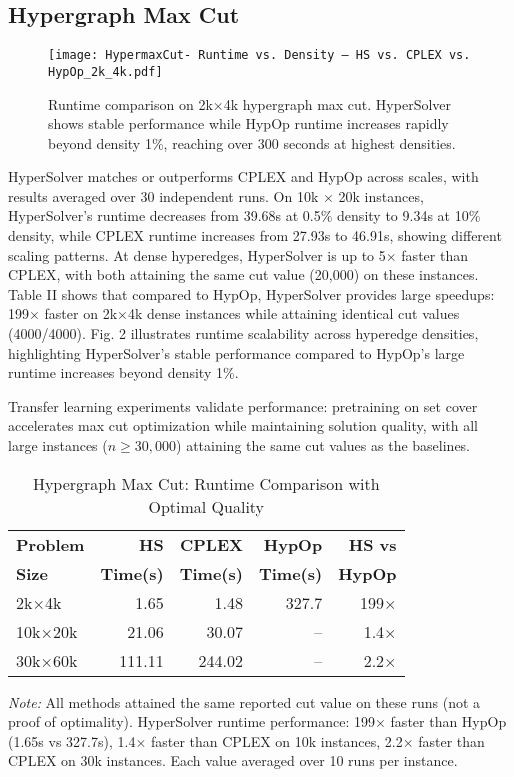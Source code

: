 \documentclass[conference]{IEEEtran}
\begin{document}
\subsection{Hypergraph Max Cut}
\begin{figure}
    \centering
    \texttt{[image: HypermaxCut- Runtime vs. Density — HS vs. CPLEX vs. HypOp\_2k\_4k.pdf]}
    \caption{Runtime comparison on 2k\(\times\)4k hypergraph max cut. HyperSolver shows stable performance while HypOp runtime increases rapidly beyond density 1\%, reaching over 300 seconds at highest densities.}
    \label{fig:maxcut-runtime}
\end{figure}
HyperSolver matches or outperforms CPLEX and HypOp across scales, with results averaged over 30 independent runs. On 10k \(\times\) 20k instances, HyperSolver's runtime decreases from 39.68s at 0.5\% density to 9.34s at 10\% density, while CPLEX runtime increases from 27.93s to 46.91s, showing different scaling patterns. At dense hyperedges, HyperSolver is up to 5\(\times\) faster than CPLEX, with both attaining the same cut value (20{,}000) on these instances. Table II shows that compared to HypOp, HyperSolver provides large speedups: 199\(\times\) faster on 2k\(\times\)4k dense instances while attaining identical cut values (4000/4000). Fig. 2 illustrates runtime scalability across hyperedge densities, highlighting HyperSolver's stable performance compared to HypOp's large runtime increases beyond density 1\%.

Transfer learning experiments validate performance: pretraining on set cover accelerates max cut optimization while maintaining solution quality, with all large instances (\(n \geq 30{,}000\)) attaining the same cut values as the baselines.

\begin{table}[htbp]
\centering
\caption{Hypergraph Max Cut: Runtime Comparison with Optimal Quality}
\label{tab:maxcut}
\footnotesize
\setlength{\tabcolsep}{6pt}
\begin{tabular}{|l|r|r|r|r|}
\hline
\textbf{Problem} & \textbf{HS} & \textbf{CPLEX} & \textbf{HypOp} & \textbf{HS vs} \\
\textbf{Size} & \textbf{Time(s)} & \textbf{Time(s)} & \textbf{Time(s)} & \textbf{HypOp} \\
\hline
2k\(\times\)4k & 1.65 & 1.48 & 327.7 & 199\(\times\) \\
10k\(\times\)20k & 21.06 & 30.07 & -- & 1.4\(\times\) \\
30k\(\times\)60k & 111.11 & 244.02 & -- & 2.2\(\times\) \\
\hline
\end{tabular}
\begin{flushleft}
\vspace{1pt}
\footnotesize
\textit{Note:} All methods attained the same reported cut value on these runs (not a proof of optimality). HyperSolver runtime performance: 199\(\times\) faster than HypOp (1.65s vs 327.7s), 1.4\(\times\) faster than CPLEX on 10k instances, 2.2\(\times\) faster than CPLEX on 30k instances. Each value averaged over 10 runs per instance.
\end{flushleft}
\end{table}
\end{document}

